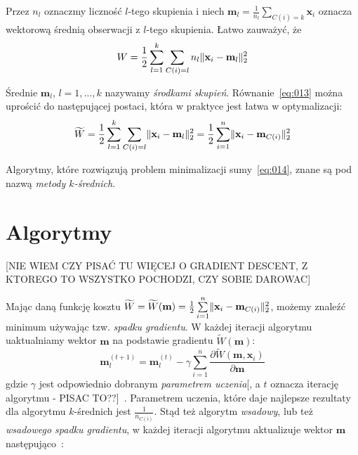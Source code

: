 \documentclass{praca1}
\DeclarePairedDelimiter{\norm}{\lVert}{\rVert}
\begin{document}
Przez $n_l$ oznaczmy liczność $l$-tego skupienia i niech $\mathbf{m}_l = \frac{1}{n_l} \sum\limits_{C(i) = k} \mathbf{x}_i$ oznacza wektorową średnią obserwacji z $l$-tego skupienia. Łatwo zauważyć, że~\cite{Koronacki2005:statystyczne}
\begin{equation}
\label{eq:013}
W = \frac{1}{2}\sum\limits_{l=1}^{k}\sum\limits_{C(i) = l} n_l \norm{\mathbf{x}_i - \mathbf{m}_l}_2^2
\end{equation}

Średnie $\mathbf{m}_l$, $l = 1,\ldots, k$ nazywamy \emph{środkami skupień}. Równanie~\ref{eq:013} można uprościć do następującej postaci, która w praktyce jest łatwa w optymalizacji:
\begin{equation}
\label{eq:014}
\widetilde{W} = \frac{1}{2}\sum\limits_{l=1}^{k}\sum\limits_{C(i) = l} \norm{\mathbf{x}_i - \mathbf{m}_l}_2^2 = \frac{1}{2}\sum\limits_{i=1}^{n} \norm{\mathbf{x}_i - \mathbf{m}_{C(i)}}_2^2 
\end{equation}

Algorytmy, które rozwiązują problem minimalizacji sumy~\ref{eq:014}, znane są pod nazwą \emph{metody $k$-średnich}.

\section{Algorytmy}

[NIE WIEM CZY PISAĆ TU WIĘCEJ O GRADIENT DESCENT, Z KTOREGO TO WSZYSTKO POCHODZI, CZY SOBIE DAROWAC]

Mając daną funkcję kosztu $\widetilde{W} = \widetilde{W}(\mathbf{m}) = \frac{1}{2}\sum\limits_{i=1}^{n} \norm{\mathbf{x}_i - \mathbf{m}_{C(i)}}_2^2 $, możemy znaleźć minimum używając tzw. \emph{spadku gradientu}. W każdej iteracji algorytmu uaktualniamy wektor $\mathbf{m}$ na podstawie gradientu $\widetilde{W}(\mathbf{m})$:
\begin{equation}
\mathbf{m}^{(t+1)}_l = \mathbf{m}_l^{(t)} - \gamma \sum\limits_{i=1}^{n} \frac{\partial \widetilde{W}(\mathbf{m}, \mathbf{x}_i)}{\partial \mathbf{m}}
\end{equation}
gdzie $\gamma$ jest odpowiednio dobranym \emph{parametrem uczenia}[, a $t$ oznacza iterację algorytmu - PISAC TO??]~\cite{bottou2012:sgdtricks}. Parametrem uczenia, które daje najlepsze rezultaty dla algorytmu $k$-średnich jest $\frac{1}{n_{C(i)}}$. Stąd też algorytm \emph{wsadowy}, lub też \emph{wsadowego spadku gradientu}, w każdej iteracji algorytmu aktualizuje wektor $\mathbf{m}$ następująco~\cite{Bottou1995:convergenceproperties}:
\end{document}
